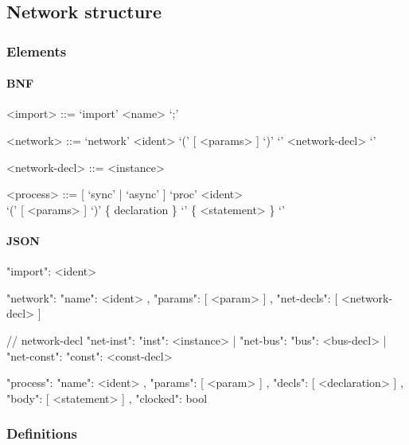 \documentclass{article}
\begin{document}
\subsection{Network structure}

\subsubsection{Elements}
\paragraph{BNF}
\begin{grammar}
  <import> ::= `import' <name> `;'

  <network> ::= `network' <ident> `(' [ <params> ] `)' `{' <network-decl> `}'

  <network-decl> ::= <instance>

  <process> ::= [ `sync' | `async' ] `proc' <ident> \\ `(' [
  <params> ] `)' \{ declaration \} `{' \{ <statement> \} `}'
\end{grammar}

\paragraph{JSON}
\begin{jsoncode}
 {"import": <ident>}

 {"network": { "name": <ident>
             , "params": [ <param> ]
             , "net-decls": [ <network-decl> ]
             }
 }

// network-decl
{ "net-inst": { "inst": <instance> }
| "net-bus": { "bus": <bus-decl> }
| "net-const": { "const": <const-decl> }
}

 {"process": { "name": <ident>
             , "params": [ <param> ]
             , "decls": [ <declaration> ]
             , "body": [ <statement> ]
             , "clocked": bool
             }
}
\end{jsoncode}

\subsubsection{Definitions}
\end{document}

